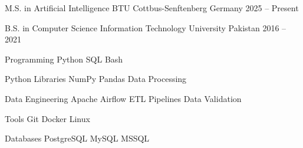 \documentclass[11pt, a4paper]{awesome-cv}
\begin{document}

\begin{cventries}

\cventry
{M.S. in Artificial Intelligence}
{BTU Cottbus-Senftenberg}
{Germany}
{2025 -- Present}
{}

\cventry
{B.S. in Computer Science}
{Information Technology University}
{Pakistan}
{2016 -- 2021}
{}

\end{cventries}


\begin{cvskills}

\cvskill
{Programming}
{Python \textbullet{} SQL \textbullet{} Bash}

\cvskill
{Python Libraries}
{NumPy \textbullet{} Pandas \textbullet{} Data Processing}

\cvskill
{Data Engineering}
{Apache Airflow \textbullet{} ETL Pipelines \textbullet{} Data Validation}

\cvskill
{Tools}
{Git \textbullet{} Docker \textbullet{} Linux}

\cvskill
{Databases}
{PostgreSQL \textbullet{} MySQL \textbullet{} MSSQL}

\end{cvskills}


\begin{cvskills}
\end{cvskills}
\end{document}
